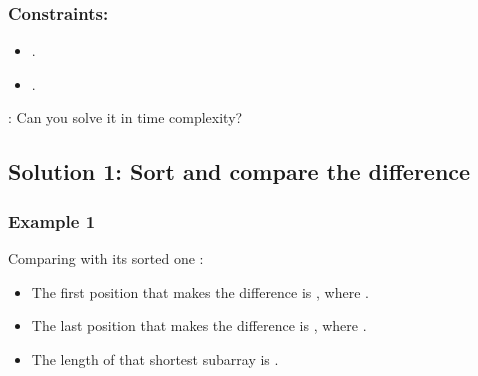 \documentclass[letterpaper,12pt,english]{book}
\begin{document}
\subsubsection{Constraints:}
\label{\detokenize{Two_Pointers/08_TP_581_Shortest_Unsorted_Continuous_Subarray:constraints}}\begin{itemize}
\item {} 
\sphinxAtStartPar
{}.

\item {} 
\sphinxAtStartPar
{}.

\end{itemize}

\sphinxAtStartPar
{}: Can you solve it in  time complexity?


\subsection{Solution 1: Sort and compare the difference}
\label{\detokenize{Two_Pointers/08_TP_581_Shortest_Unsorted_Continuous_Subarray:solution-1-sort-and-compare-the-difference}}

\subsubsection{Example 1}
\label{\detokenize{Two_Pointers/08_TP_581_Shortest_Unsorted_Continuous_Subarray:id1}}
\sphinxAtStartPar
Comparing  with its sorted one :
\begin{itemize}
\item {} 
\sphinxAtStartPar
The first position that makes the difference is , where .

\item {} 
\sphinxAtStartPar
The last position that makes the difference is , where .

\item {} 
\sphinxAtStartPar
The length of that shortest subarray is .

\end{itemize}
\end{document}
